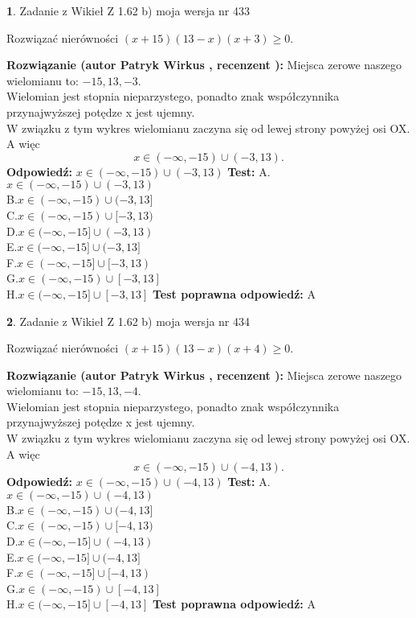 \documentclass[12pt, a4paper]{article}
\theoremstyle{definition} %
\newtheorem{zad}{}
\newcommand{\zadStart}[1]{\begin{zad}#1\newline}
\newcommand{\zadStop}{\end{zad}}
\newcommand{\rozwStart}[2]{\noindent \textbf{Rozwiązanie (autor #1 , recenzent #2): }\newline}
\newcommand{\rozwStop}{\newline}
\newcommand{\odpStart}{\noindent \textbf{Odpowiedź:}\newline}
\newcommand{\odpStop}{\newline}
\newcommand{\testStart}{\noindent \textbf{Test:}\newline}
\newcommand{\testStop}{\newline}
\newcommand{\kluczStart}{\noindent \textbf{Test poprawna odpowiedź:}\newline}
\newcommand{\kluczStop}{\newline}
\begin{document}
\zadStart{Zadanie z Wikieł Z 1.62 b) moja wersja nr 433}

Rozwiązać nierówności $(x+15)(13-x)(x+3)\ge0$.
\zadStop
\rozwStart{Patryk Wirkus}{}
Miejsca zerowe naszego wielomianu to: $-15, 13, -3$.\\
Wielomian jest stopnia nieparzystego, ponadto znak współczynnika przy\linebreak najwyższej potędze x jest ujemny.\\ W związku z tym wykres wielomianu zaczyna się od lewej strony powyżej osi OX. A więc $$x \in (-\infty,-15) \cup (-3,13).$$
\rozwStop
\odpStart
$x \in (-\infty,-15) \cup (-3,13)$
\odpStop
\testStart
A.$x \in (-\infty,-15) \cup (-3,13)$\\
B.$x \in (-\infty,-15) \cup (-3,13]$\\
C.$x \in (-\infty,-15) \cup [-3,13)$\\
D.$x \in (-\infty,-15] \cup (-3,13)$\\
E.$x \in (-\infty,-15] \cup (-3,13]$\\
F.$x \in (-\infty,-15] \cup [-3,13)$\\
G.$x \in (-\infty,-15) \cup [-3,13]$\\
H.$x \in (-\infty,-15] \cup [-3,13]$
\testStop
\kluczStart
A
\kluczStop



\zadStart{Zadanie z Wikieł Z 1.62 b) moja wersja nr 434}

Rozwiązać nierówności $(x+15)(13-x)(x+4)\ge0$.
\zadStop
\rozwStart{Patryk Wirkus}{}
Miejsca zerowe naszego wielomianu to: $-15, 13, -4$.\\
Wielomian jest stopnia nieparzystego, ponadto znak współczynnika przy\linebreak najwyższej potędze x jest ujemny.\\ W związku z tym wykres wielomianu zaczyna się od lewej strony powyżej osi OX. A więc $$x \in (-\infty,-15) \cup (-4,13).$$
\rozwStop
\odpStart
$x \in (-\infty,-15) \cup (-4,13)$
\odpStop
\testStart
A.$x \in (-\infty,-15) \cup (-4,13)$\\
B.$x \in (-\infty,-15) \cup (-4,13]$\\
C.$x \in (-\infty,-15) \cup [-4,13)$\\
D.$x \in (-\infty,-15] \cup (-4,13)$\\
E.$x \in (-\infty,-15] \cup (-4,13]$\\
F.$x \in (-\infty,-15] \cup [-4,13)$\\
G.$x \in (-\infty,-15) \cup [-4,13]$\\
H.$x \in (-\infty,-15] \cup [-4,13]$
\testStop
\kluczStart
A
\kluczStop
\end{document}
